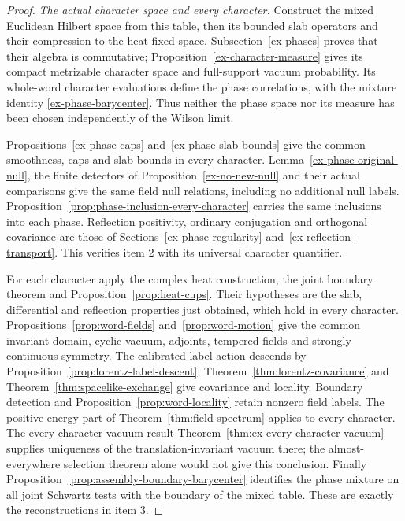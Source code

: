 \begin{proof}
\emph{The actual character space and every character.}
Construct the mixed Euclidean Hilbert space from this table, then its
bounded slab operators and their compression to the heat-fixed space.
Subsection~\ref{ex-phases} proves that their algebra is commutative;
Proposition~\ref{ex-character-measure} gives its compact metrizable
character space and full-support vacuum probability. Its whole-word
character evaluations define the phase correlations, with the mixture
identity \eqref{ex-phase-barycenter}. Thus neither the phase space nor
its measure has been chosen independently of the Wilson limit.

Propositions~\ref{ex-phase-caps} and~\ref{ex-phase-slab-bounds}
give the common smoothness, caps and slab bounds in every character.
Lemma~\ref{ex-phase-original-null}, the finite detectors of
Proposition~\ref{ex-no-new-null} and their actual comparisons give the
same field null relations, including no additional null labels.
Proposition~\ref{prop:phase-inclusion-every-character} carries the same
inclusions into each phase. Reflection positivity, ordinary conjugation
and orthogonal covariance are those of
Sections~\ref{ex-phase-regularity} and~\ref{ex-reflection-transport}.
This verifies item 2 with its universal character quantifier.

For each character apply the complex heat construction, the joint
boundary theorem and Proposition~\ref{prop:heat-cups}. Their hypotheses
are the slab, differential and reflection properties just obtained,
which hold in every character. Propositions~\ref{prop:word-fields}
and~\ref{prop:word-motion} give the common invariant domain, cyclic
vacuum, adjoints, tempered fields and strongly continuous symmetry.
The calibrated label action descends by
Proposition~\ref{prop:lorentz-label-descent};
Theorem~\ref{thm:lorentz-covariance} and
Theorem~\ref{thm:spacelike-exchange} give covariance and locality.
Boundary detection and Proposition~\ref{prop:word-locality} retain
nonzero field labels. The positive-energy part of
Theorem~\ref{thm:field-spectrum} applies to every character.
The every-character vacuum result
Theorem~\ref{thm:ex-every-character-vacuum} supplies uniqueness of
the translation-invariant vacuum there; the almost-everywhere
selection theorem alone would not give this conclusion.
Finally Proposition~\ref{prop:assembly-boundary-barycenter} identifies
the phase mixture on all joint Schwartz tests with the boundary of the
mixed table. These are exactly the reconstructions in item 3.


\end{proof}
